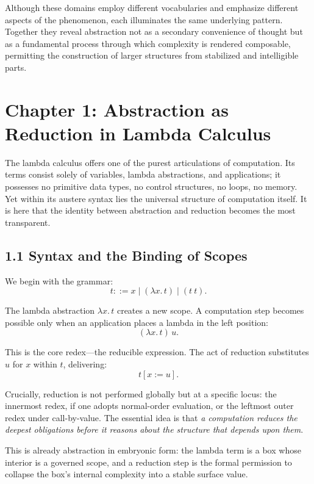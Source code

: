 \documentclass[12pt,letterpaper]{article}
\theoremstyle{remark}
\begin{document}
Although these domains employ different vocabularies and emphasize different aspects of the phenomenon, each illuminates the same underlying pattern. Together they reveal abstraction not as a secondary convenience of thought but as a fundamental process through which complexity is rendered composable, permitting the construction of larger structures from stabilized and intelligible parts.

\newpage

\section{Chapter 1: Abstraction as Reduction in Lambda Calculus}

The lambda calculus offers one of the purest articulations of computation. Its terms consist solely of variables, lambda abstractions, and applications; it possesses no primitive data types, no control structures, no loops, no memory. Yet within its austere syntax lies the universal structure of computation itself. It is here that the identity between abstraction and reduction becomes the most transparent.

\subsection{1.1 Syntax and the Binding of Scopes}

We begin with the grammar:
\[
t ::= x \mid (\lambda x.\, t) \mid (t~t).
\]

The lambda abstraction \(\lambda x.\, t\) creates a new scope. A computation step becomes possible only when an application places a lambda in the left position:
\[
(\lambda x.\, t)\, u.
\]

This is the core redex---the reducible expression. The act of reduction substitutes \(u\) for \(x\) within \(t\), delivering:
\[
t[x := u].
\]

Crucially, reduction is not performed globally but at a specific locus: the innermost redex, if one adopts normal-order evaluation, or the leftmost outer redex under call-by-value. The essential idea is that \emph{a computation reduces the deepest obligations before it reasons about the structure that depends upon them}.

This is already abstraction in embryonic form: the lambda term is a box whose interior is a governed scope, and a reduction step is the formal permission to collapse the box’s internal complexity into a stable surface value.
\end{document}
